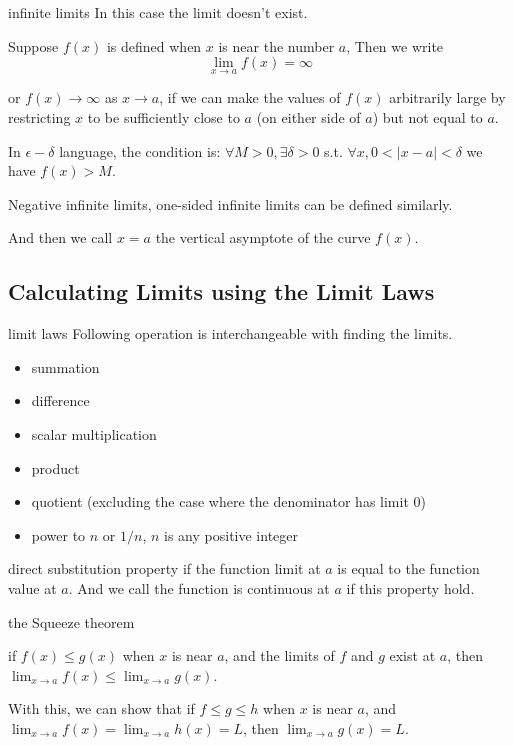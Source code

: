 \documentclass[Calculus 1 Recitation.tex]{subfiles}
\begin{document}
\begin{myleftlinebox}
	infinite limits
	\tcblower
	In this case the limit doesn't exist.

	Suppose $f(x)$ is defined when $x$ is near the number $a$, Then we write
	\[\lim_{x\to a}f(x)=\infty\]

	or \(f(x)\to \infty\) as $x\to a$, if we can make the values of $f(x)$ arbitrarily large by restricting $x$ to be sufficiently close to $a$ (on either side of $a$) but not equal to $a$. 

	In $\epsilon-\delta$ language, the condition is: $\forall M > 0, \exists \delta > 0$ s.t. $\forall x, 0 < |x - a| < \delta$ we have $f(x)>M$.

	Negative infinite limits, one-sided infinite limits can be defined similarly.
	
	And then we call $x=a$ the vertical asymptote of the curve $f(x)$.
\end{myleftlinebox}


\subsection{Calculating Limits using the Limit Laws}


\begin{myleftlinebox}
	limit laws
	\tcblower
	Following operation is interchangeable with finding the limits.
	\begin{itemize}
		\item summation
		\item difference
		\item scalar multiplication
		\item product
		\item quotient (excluding the case where the denominator has limit $0$)
		\item power to $n$ or $1/n$, $n$ is any positive integer
	\end{itemize}
\end{myleftlinebox}

\begin{myleftlinebox}
	direct substitution property
	\tcblower
	if the function limit at $a$ is equal to the function value at $a$. And we call the function is continuous at $a$ if this property hold.
\end{myleftlinebox}

\begin{myleftlinebox}
	the Squeeze theorem
	\tcblower
	\begin{lemma}
		if $f(x)\leq g(x)$ when $x$ is near $a$, and the limits of $f$ and $g$ exist at $a$, then $\lim_{x\to a} f(x)\leq \lim_{x\to a} g(x)$.
	\end{lemma}
	\begin{theorem}
		With this, we can show that if $f\leq g\leq h$ when $x$ is near $a$, and $\lim_{x\to a} f(x) = \lim_{x\to a} h(x)=L$, then $\lim_{x\to a} g(x)=L$.
	\end{theorem}
\end{myleftlinebox}
\end{document}

